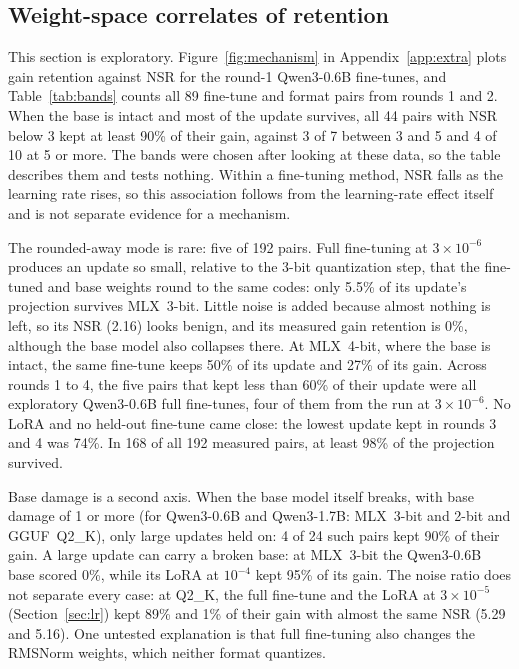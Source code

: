 \documentclass[10pt]{article}
\begin{document}
\subsection{Weight-space correlates of retention}
\label{sec:mech-results}

This section is exploratory. Figure~\ref{fig:mechanism} in Appendix~\ref{app:extra} plots gain retention against NSR for the round-1 Qwen3-0.6B fine-tunes, and Table~\ref{tab:bands} counts all 89 fine-tune and format pairs from rounds 1 and 2. When the base is intact and most of the update survives, all 44 pairs with NSR below 3 kept at least 90\% of their gain, against 3 of 7 between 3 and 5 and 4 of 10 at 5 or more. The bands were chosen after looking at these data, so the table describes them and tests nothing. Within a fine-tuning method, NSR falls as the learning rate rises, so this association follows from the learning-rate effect itself and is not separate evidence for a mechanism.

The rounded-away mode is rare: five of 192 pairs. Full fine-tuning at $3\times10^{-6}$ produces an update so small, relative to the 3-bit quantization step, that the fine-tuned and base weights round to the same codes: only 5.5\% of its update's projection survives MLX~3-bit. Little noise is added because almost nothing is left, so its NSR (2.16) looks benign, and its measured gain retention is 0\%, although the base model also collapses there. At MLX~4-bit, where the base is intact, the same fine-tune keeps 50\% of its update and 27\% of its gain. Across rounds 1 to 4, the five pairs that kept less than 60\% of their update were all exploratory Qwen3-0.6B full fine-tunes, four of them from the run at $3\times10^{-6}$. No LoRA and no held-out fine-tune came close: the lowest update kept in rounds 3 and 4 was 74\%. In 168 of all 192 measured pairs, at least 98\% of the projection survived.

Base damage is a second axis. When the base model itself breaks, with base damage of 1 or more (for Qwen3-0.6B and Qwen3-1.7B: MLX~3-bit and 2-bit and GGUF~Q2\_K), only large updates held on: 4 of 24 such pairs kept 90\% of their gain. A large update can carry a broken base: at MLX~3-bit the Qwen3-0.6B base scored 0\%, while its LoRA at $10^{-4}$ kept 95\% of its gain. The noise ratio does not separate every case: at Q2\_K, the full fine-tune and the LoRA at $3\times10^{-5}$ (Section~\ref{sec:lr}) kept 89\% and 1\% of their gain with almost the same NSR (5.29 and 5.16). One untested explanation is that full fine-tuning also changes the RMSNorm weights, which neither format quantizes.
\end{document}
